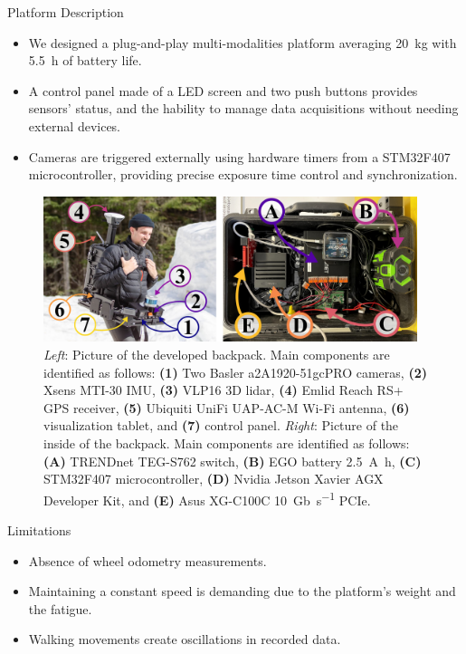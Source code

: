 \documentclass[final,hyperref={pdfpagelabels=false}]{beamer}
\begin{document}
\begin{frame}[t]
\begin{columns}[t]
\begin{column}{.465\textwidth}
\begin{block}{Platform Description}
	\begin{itemize}
		\item We designed a plug-and-play multi-modalities platform averaging \SI{20}{\kilo\gram} with \SI{5.5}{\hour} of battery life.
		\item A control panel made of a LED screen and two push buttons provides sensors' status, and the hability to manage data acquisitions without needing external devices. 
		\item Cameras are triggered externally using hardware timers from a STM32F407 microcontroller, providing precise exposure time control and synchronization. 
	\end{itemize}
	\begin{figure}%
		\includegraphics[width=0.975\textwidth]{./figures/backpack_sensors_and_inside.pdf}
		\captionsetup{width = 0.975\linewidth, justification=justified, name=Figure 2}
		\caption{
			\textit{Left}: Picture of the developed backpack.
			Main components are identified as follows: \textbf{(1)} Two Basler a2A1920-51gcPRO cameras, \textbf{(2)} Xsens MTI-30 \ac{IMU}, \textbf{(3)} VLP16 3D lidar, \textbf{(4)} Emlid Reach RS+ GPS receiver, \textbf{(5)} Ubiquiti UniFi UAP-AC-M Wi-Fi antenna, \textbf{(6)} visualization tablet, and \textbf{(7)} control panel.
			\textit{Right}: Picture of the inside of the backpack. Main components are identified as follows: \textbf{(A)} TRENDnet TEG-S762 switch, \textbf{(B)} EGO battery \SI{2.5}{\ampere\hour}, \textbf{(C)} STM32F407 microcontroller, \textbf{(D)} Nvidia Jetson Xavier AGX Developer Kit, and \textbf{(E)} Asus XG-C100C \SI{10}{\giga b\per\second} PCIe.
			}
	\end{figure}
\end{block}

\begin{block}{Limitations}
	\begin{itemize}
		\item Absence of wheel odometry measurements.
		\item Maintaining a constant speed is demanding due to the platform's weight and the fatigue.
		\item Walking movements create oscillations in recorded data.
	\end{itemize}
\end{block}



\end{column}
\end{columns}
\end{frame}
\end{document}
